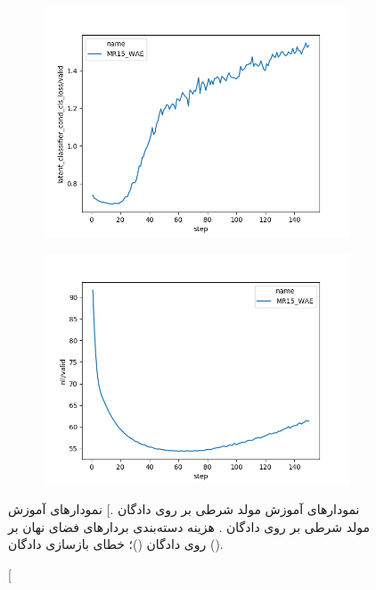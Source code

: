 \begin{figure}[h]
	\centering
	\begin{subfigure}{0.3\textheight}
		\centering
		\includegraphics[width=1.\textwidth]{images/figs2/2020_01_15__11_45_45__latent_classifier_cond_cls_loss.png}
		\caption{}
		\label{fig:chap4:mr15_cls}
	\end{subfigure}
	\begin{subfigure}{0.3\textheight}
		\centering
		\includegraphics[width=1.\textwidth]{images/figs2/2020_01_15__11_45_45__nll.png}
		\caption{}
		\label{fig:chap4:mr15_nll}
	\end{subfigure}
	\caption
	[نمودار‌های آموزش مولد شرطی بر روی دادگان \sst{}.]
	{
		نمودار‌های آموزش مولد شرطی بر روی دادگان \sst{}.
		هزینه دسته‌بندی بردار‌های فضای نهان بر روی دادگان \validation{}
		()؛
		خطای بازسازی دادگان \validation{}
		().
	}
	\label{fig:chap4:mr15}
\end{figure}
